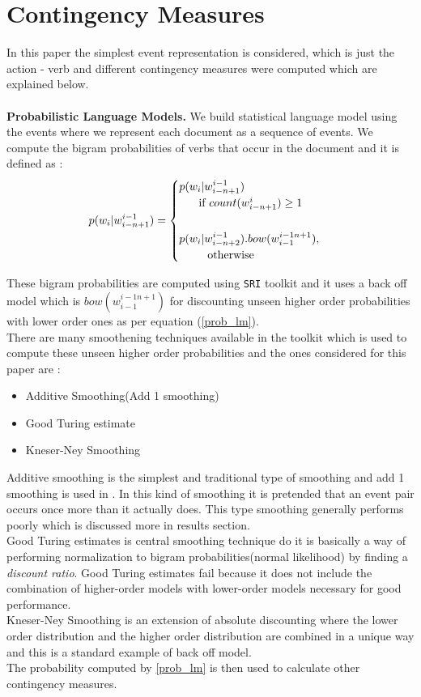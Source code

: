 \documentclass[12pt]{article}
\begin{document}
\section{Contingency Measures}
In this paper the simplest event representation is considered, which is just the action - verb and different contingency measures were computed which are explained below. \\
\smallskip \\
{\bf Probabilistic Language Models.}
We build statistical language model using the events where we represent each document as a sequence of events\cite{manshadi}. We compute the bigram probabilities of verbs that occur in the document and it is defined as :
\begin{equation}\label{prob_lm}
p(w_i | w_{i-n+1}^{i-1}) =
\begin{cases}
p(w_i | w_{i-n+1}^{i-1}) &  \\
 \;\;\;\;\; \text{ if } count(\tiny w_{i-n+1}^i) \geq 1 \\
 \smallskip \\
p(w_i | w_{i-n+2}^{i-1}).bow(w_{i-1}^{i-1n+1}), & \\
 \;\;\;\;\;\;\;\;\; \text{otherwise} \\
\end{cases}
\end{equation}

These bigram probabilities are computed using \texttt{SRI} toolkit and it uses a back off model which is $bow(w_{i-1}^{i-1n+1})$ for discounting unseen higher order probabilities with lower order ones as per equation (\ref{prob_lm}). \\

There are many smoothening techniques available in the toolkit which is used to compute these unseen higher order probabilities and the ones considered for this paper are : 
\begin{itemize}
	\item Additive Smoothing(Add 1 smoothing)
	\item Good Turing estimate
	\item Kneser-Ney Smoothing
\end{itemize}
Additive smoothing is the simplest and traditional type of smoothing and add 1 smoothing is used in \cite{film}. In this kind of smoothing it is pretended that an event pair occurs once more than it actually does. This type smoothing generally performs poorly which is discussed more in results section. \\ 
 Good Turing estimates is central smoothing technique do it is basically a way of performing normalization to bigram probabilities(normal likelihood) by finding a \textit{discount ratio}. Good Turing estimates fail because it
 does not include the combination of higher-order models with lower-order models necessary for good performance. \\
 Kneser-Ney Smoothing is an extension of absolute discounting where the lower order distribution and the higher order distribution are combined in a unique way and this is a standard example of back off model. \\
The probability computed by \ref{prob_lm} is then used to calculate other contingency measures. \\
\end{document}
